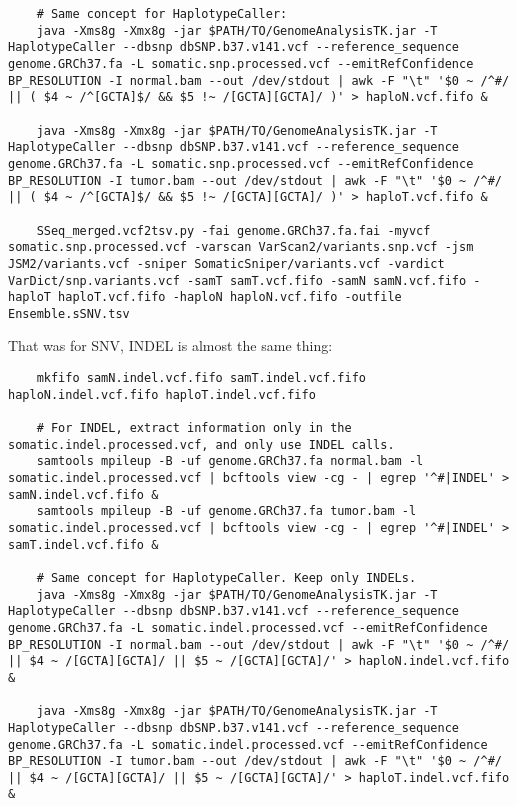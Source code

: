 \documentclass[10pt,letterpaper]{article}
\begin{document}
\begin{sloppypar}
\begin{lstlisting}
	# Same concept for HaplotypeCaller:
	java -Xms8g -Xmx8g -jar $PATH/TO/GenomeAnalysisTK.jar -T HaplotypeCaller --dbsnp dbSNP.b37.v141.vcf --reference_sequence genome.GRCh37.fa -L somatic.snp.processed.vcf --emitRefConfidence BP_RESOLUTION -I normal.bam --out /dev/stdout | awk -F "\t" '$0 ~ /^#/ || ( $4 ~ /^[GCTA]$/ && $5 !~ /[GCTA][GCTA]/ )' > haploN.vcf.fifo &

	java -Xms8g -Xmx8g -jar $PATH/TO/GenomeAnalysisTK.jar -T HaplotypeCaller --dbsnp dbSNP.b37.v141.vcf --reference_sequence genome.GRCh37.fa -L somatic.snp.processed.vcf --emitRefConfidence BP_RESOLUTION -I tumor.bam --out /dev/stdout | awk -F "\t" '$0 ~ /^#/ || ( $4 ~ /^[GCTA]$/ && $5 !~ /[GCTA][GCTA]/ )' > haploT.vcf.fifo &
		
	SSeq_merged.vcf2tsv.py -fai genome.GRCh37.fa.fai -myvcf somatic.snp.processed.vcf -varscan VarScan2/variants.snp.vcf -jsm JSM2/variants.vcf -sniper SomaticSniper/variants.vcf -vardict VarDict/snp.variants.vcf -samT samT.vcf.fifo -samN samN.vcf.fifo -haploT haploT.vcf.fifo -haploN haploN.vcf.fifo -outfile Ensemble.sSNV.tsv
	\end{lstlisting}


	That was for SNV, INDEL is almost the same thing:

	\begin{lstlisting}
	mkfifo samN.indel.vcf.fifo samT.indel.vcf.fifo haploN.indel.vcf.fifo haploT.indel.vcf.fifo

	# For INDEL, extract information only in the somatic.indel.processed.vcf, and only use INDEL calls.
	samtools mpileup -B -uf genome.GRCh37.fa normal.bam -l somatic.indel.processed.vcf | bcftools view -cg - | egrep '^#|INDEL' > samN.indel.vcf.fifo &
	samtools mpileup -B -uf genome.GRCh37.fa tumor.bam -l somatic.indel.processed.vcf | bcftools view -cg - | egrep '^#|INDEL' > samT.indel.vcf.fifo &

	# Same concept for HaplotypeCaller. Keep only INDELs.
	java -Xms8g -Xmx8g -jar $PATH/TO/GenomeAnalysisTK.jar -T HaplotypeCaller --dbsnp dbSNP.b37.v141.vcf --reference_sequence genome.GRCh37.fa -L somatic.indel.processed.vcf --emitRefConfidence BP_RESOLUTION -I normal.bam --out /dev/stdout | awk -F "\t" '$0 ~ /^#/ || $4 ~ /[GCTA][GCTA]/ || $5 ~ /[GCTA][GCTA]/' > haploN.indel.vcf.fifo &

	java -Xms8g -Xmx8g -jar $PATH/TO/GenomeAnalysisTK.jar -T HaplotypeCaller --dbsnp dbSNP.b37.v141.vcf --reference_sequence genome.GRCh37.fa -L somatic.indel.processed.vcf --emitRefConfidence BP_RESOLUTION -I tumor.bam --out /dev/stdout | awk -F "\t" '$0 ~ /^#/ || $4 ~ /[GCTA][GCTA]/ || $5 ~ /[GCTA][GCTA]/' > haploT.indel.vcf.fifo &
		

\end{lstlisting}
\end{sloppypar}
\end{document}
